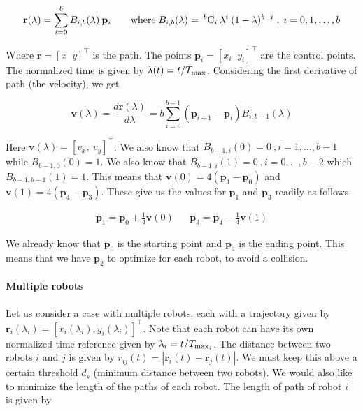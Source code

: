 \begin{equation}
    \mathbf{r}(\lambda) = \sum_{i=0}^{b} B_{i, b} (\lambda) \: \mathbf{p}_i \qquad \textup{where} \; B_{i, b} (\lambda) = \: ^{b}\textup{C}_i \: \lambda^i \: (1-\lambda)^{b-i} \;,\; i = 0, 1, \dots, b
\end{equation}

Where $\mathbf{r} = [x\;\;y]^\top$ is the path. The points $\mathbf{p}_i = [x_i\;\;y_i]^\top$ are the control points.
The normalized time is given by $\lambda(t) = t/T_{\textup{max}}$.
Considering the first derivative of path (the velocity), we get

\begin{equation}
    \mathbf{v}(\lambda) = \frac{d \mathbf{r}(\lambda)}{d \lambda} = b \sum_{i = 0}^{b-1} \left ( \mathbf{p}_{i+1} - \mathbf{p}_i \right ) B_{i, b-1} (\lambda)
\end{equation}

Here $\mathbf{v}(\lambda) = [v_x,\:v_y]^\top$. We also know that $B_{b-1, i}(0) = 0 \:, i = 1, \dots, b-1$ while $B_{b-1, 0}(0) = 1$. We also know that $B_{b-1, i}(1) = 0 \:, i = 0, \dots, b-2$ which $B_{b-1, b-1}(1) = 1$.
This means that $\mathbf{v}(0) = 4(\mathbf{p}_1 - \mathbf{p}_0)$ and $\mathbf{v}(1) = 4(\mathbf{p}_4 - \mathbf{p}_3)$. 
These give us the values for $\mathbf{p}_1$ and $\mathbf{p}_3$ readily as follows

\begin{align}
    \mathbf{p}_1 = \mathbf{p}_0 + \frac{1}{4} \mathbf{v}(0) &&
    \mathbf{p}_3 = \mathbf{p}_4 - \frac{1}{4} \mathbf{v}(1)
\end{align}

We already know that $\mathbf{p}_0$ is the starting point and $\mathbf{p}_4$ is the ending point. This means that we have $\mathbf{p}_2$ to optimize for each robot, to avoid a collision.

\paragraph{Multiple robots}

Let us consider a case with multiple robots, each with a trajectory given by $\mathbf{r}_i(\lambda_i) = \left[ x_i(\lambda_i), y_i(\lambda_i) \right]^\top$. Note that each robot can have its own normalized time reference given by $\lambda_i = t/T_{\textup{max}_i}$.
The distance between two robots $i$ and $j$ is given by $r_{ij}(t) = |\mathbf{r}_i(t) - \mathbf{r}_j(t)|$. We must keep this above a certain threshold $d_s$ (minimum distance between two robots).
We would also like to minimize the length of the paths of each robot. The length of path of robot $i$ is given by

